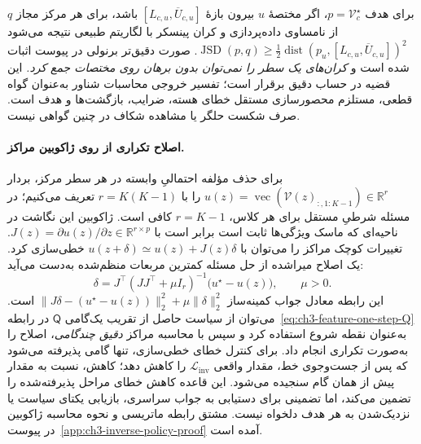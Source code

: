 برای هدف $p=\mathcal V_c^\star$، اگر مختصهٔ $u$ بیرون بازهٔ $[L_{c,u},\overline U_{c,u}]$ باشد، برای هر مرکز مجاز $q$ از نامساوی داده‌پردازی و کران پینسکر با لگاریتم طبیعی نتیجه می‌شود
$\operatorname{JSD}(p,q)\ge \frac12\operatorname{dist}(p_u,[L_{c,u},\overline U_{c,u}])^2$.
صورت دقیق‌تر برنولی در پیوست اثبات شده است و \emph{کران‌های یک سطر را نمی‌توان بدون برهان روی مختصات جمع کرد.}
این قضیه در حساب دقیق برقرار است؛ تفسیر خروجی محاسبات شناور به‌عنوان گواه قطعی، مستلزم محصورسازی مستقل خطای هسته، ضرایب، بازگشت‌ها و هدف است. صرف شکست حلگر یا مشاهده شکاف در  چنین گواهی نیست.

\paragraph{اصلاح تکراری از روی ژاکوبین مراکز.}
برای حذف مؤلفه احتمالیِ وابسته در هر سطر مرکز، بردار
$u(z)=\operatorname{vec}(\mathcal V(z)_{:,1:K-1})\in\mathbb R^r$
را با $r=K(K-1)$ تعریف می‌کنیم؛ در مسئله شرطیِ مستقل برای هر کلاس، $r=K-1$ کافی است. ژاکوبین این نگاشت در ناحیه‌ای که ماسک ویژگی‌ها ثابت است برابر است با
$J(z)=\partial u(z)/\partial z\in\mathbb R^{r\times p}$.
تغییرات کوچک مراکز را می‌توان با
$u(z+\delta)\simeq u(z)+J(z)\delta$
خطی‌سازی کرد. یک اصلاح میراشده از حل مسئله کمترین مربعات منظم‌شده به‌دست می‌آید:
\begin{equation}\label{eq:ch3-inverse-GN}
\boxed{\delta=
J^\top(JJ^\top+\mu I_r)^{-1}
\bigl(u^\star-u(z)\bigr),\qquad \mu>0.}
\end{equation}
این رابطه معادل جواب کمینه‌ساز
$\|J\delta-(u^\star-u(z))\|_2^2+\mu\|\delta\|_2^2$
است. می‌توان از سیاست حاصل از تقریب یک‌گامی $\mathsf Q$ در رابطه~\eqref{eq:ch3-feature-one-step-Q} به‌عنوان نقطه شروع استفاده کرد و سپس با محاسبه مراکز \emph{دقیق چندگامی}، اصلاح را به‌صورت تکراری انجام داد. برای کنترل خطای خطی‌سازی، تنها گامی پذیرفته می‌شود که پس از جست‌وجوی خط، مقدار واقعی $\mathcal L_{\mathrm{inv}}$ را کاهش دهد؛ کاهش، نسبت به مقدار پیش از همان گام سنجیده می‌شود. این قاعده کاهش خطای مراحل پذیرفته‌شده را تضمین می‌کند، اما تضمینی برای دستیابی به جواب سراسری، بازیابی یکتای سیاست یا نزدیک‌شدن به هر هدف دلخواه نیست. مشتق رابطه ماتریسی و نحوه محاسبه ژاکوبین در پیوست~\ref{app:ch3-inverse-policy-proof} آمده است.


